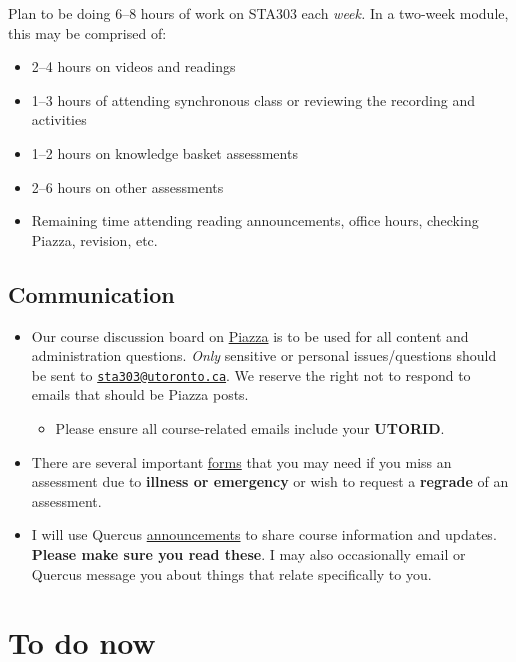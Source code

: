 \documentclass[
  openany]{book}
\providecommand{\tightlist}{%
  \setlength{\itemsep}{0pt}\setlength{\parskip}{0pt}}
\begin{document}
Plan to be doing 6--8 hours of work on STA303 each \emph{week.} In a two-week module, this may be comprised of:

\begin{itemize}
\item
  2--4 hours on videos and readings
\item
  1--3 hours of attending synchronous class or reviewing the recording and activities
\item
  1--2 hours on knowledge basket assessments
\item
  2--6 hours on other assessments
\item
  Remaining time attending reading announcements, office hours, checking Piazza, revision, etc.
\end{itemize}

\hypertarget{communication}{%
\subsection{Communication}\label{communication}}

\begin{itemize}
\item
  Our course discussion board on \href{https://piazza.com/class/kx47tj4fmy65dg}{Piazza} is to be used for all content and administration questions. \emph{Only} sensitive or personal issues/questions should be sent to \href{mailto:sta303@utoronto.ca}{\nolinkurl{sta303@utoronto.ca}}. We reserve the right not to respond to emails that should be Piazza posts.

  \begin{itemize}
  \tightlist
  \item
    Please ensure all course-related emails include your \textbf{UTORID}.~
  \end{itemize}
\item
  There are several important \protect\hyperlink{forms}{forms} that you may need if you miss an assessment due to \textbf{illness or emergency} or wish to request a \textbf{regrade} of an assessment.
\item
  I will use Quercus \href{https://q.utoronto.ca/courses/253305/announcements}{announcements} to share course information and updates. \textbf{Please make sure you read these}. I may also occasionally email or Quercus message you about things that relate specifically to you.
\end{itemize}

\hypertarget{to-do-now}{%
\section{To do now}\label{to-do-now}}
\end{document}

